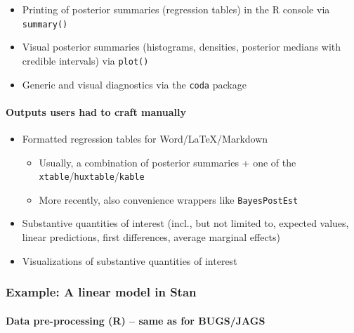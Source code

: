 \documentclass[
  11pt,
]{article}
\providecommand{\tightlist}{%
  \setlength{\itemsep}{0pt}\setlength{\parskip}{0pt}}
\begin{document}
\begin{itemize}
\tightlist
\item
  Printing of posterior summaries (regression tables) in the R console via \texttt{summary()}
\item
  Visual posterior summaries (histograms, densities, posterior medians with credible intervals) via \texttt{plot()}
\item
  Generic and visual diagnostics via the \texttt{coda} package
\end{itemize}

\hypertarget{outputs-users-had-to-craft-manually}{%
\paragraph{Outputs users had to craft manually}\label{outputs-users-had-to-craft-manually}}

\begin{itemize}
\tightlist
\item
  Formatted regression tables for Word/LaTeX/Markdown

  \begin{itemize}
  \tightlist
  \item
    Usually, a combination of posterior summaries + one of the \texttt{xtable}/\texttt{huxtable}/\texttt{kable}
  \item
    More recently, also convenience wrappers like \texttt{BayesPostEst}
  \end{itemize}
\item
  Substantive quantities of interest (incl., but not limited to, expected values, linear predictions, first differences, average marginal effects)
\item
  Visualizations of substantive quantities of interest
\end{itemize}

\hypertarget{example-a-linear-model-in-stan}{%
\subsubsection{Example: A linear model in Stan}\label{example-a-linear-model-in-stan}}

\hypertarget{data-pre-processing-r-same-as-for-bugsjags}{%
\paragraph{Data pre-processing (R) -- same as for BUGS/JAGS}\label{data-pre-processing-r-same-as-for-bugsjags}}
\end{document}
